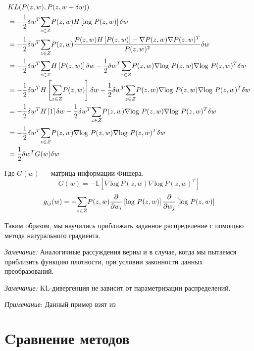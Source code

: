 \documentclass[a4paper,12pt]{article}
\begin{document}
$$
\begin{aligned}
    & KL(P(z, w), P(z, w + \delta w)) \\
    & = -\frac{1}{2} \delta w^T\overset{}{\underset{z \in Z}{\sum}}{P}(z, w) H\left[\mbox{log} ~ P(z, w)\right] \delta w \\
    & = -\frac{1}{2} \delta w^T\overset{}{\underset{z \in Z}{\sum}}{P}(z, w) \frac{P(z, w) H\left[P(z, w)\right] - \nabla P(z, w)\nabla P(z, w)^T}{P(z, w)^2} \delta w \\
    & = -\frac{1}{2} \delta w^T\overset{}{\underset{z \in Z}{\sum}}{H}\left[P(z, w)\right] \delta w - \frac{1}{2} \delta w^T\overset{}{\underset{z \in Z}{\sum}}{P}(z, w) \nabla \mbox{log} ~ P(z, w)\nabla \mbox{log} ~ P(z, w)^T \delta w \\
    & = -\frac{1}{2} \delta w^TH\left[\overset{}{\underset{z \in Z}{\sum}}{P}(z, w)\right] \delta w - \frac{1}{2} \delta w^T\overset{}{\underset{z \in Z}{\sum}}{P}(z, w) \nabla \mbox{log} ~ P(z, w)\nabla \mbox{log} ~ P(z, w)^T \delta w \\
    & = -\frac{1}{2} \delta w^TH\left[1\right] \delta w - \frac{1}{2} \delta w^T\overset{}{\underset{z \in Z}{\sum}}{P}(z, w) \nabla \mbox{log} ~ P(z, w)\nabla \mbox{log} ~ P(z, w)^T \delta w \\
    & = -\frac{1}{2} \delta w^T\overset{}{\underset{z \in Z}{\sum}}{P}(z, w) \nabla \mbox{log} ~ P(z, w)\nabla \mbox{log} ~ P(z, w)^T \delta w \\
    & = \frac{1}{2} \delta w^T G(w) \delta w \\
\end{aligned}
$$

Где $G(w)$ --- матрица информации Фишера. \label{FisherMatrix}
$$G(w) = \mathbb{-E} \left[ \nabla \mbox{log} ~ P(z, w) \nabla \mbox{log} ~ P(z, w)^T \right] $$
$$g_{ij}(w) = -\overset{}{\underset{z \in Z}{\sum}}{P(z, w)\frac{\partial}{\partial w_i}\left[ \mbox{log} ~ P(z, w)\right] \frac{\partial}{\partial w_j}\left[ \mbox{log} ~ P(z, w)\right]}$$

Таким образом, мы научились приближать заданное распределение с помощью метода натурального градиента.

\emph{Замечание:}
Аналогичные рассуждения верны и в случае, когда мы пытаемся приблизить функцию плотности, при условии законности данных преобразований.

\emph{Замечание:}
KL-дивергенция не зависит от параметризации распределений.

\emph{Примечание}:
Данный пример взят из \cite{AmariWorks}

\newpage

\section{Cравнение методов}
\end{document}
